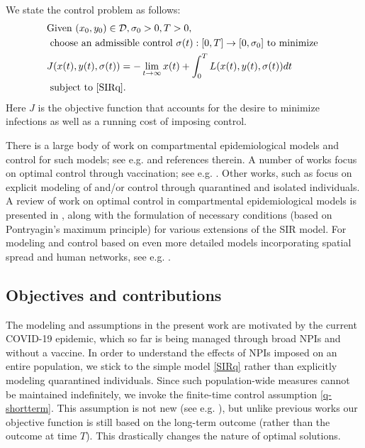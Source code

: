 \documentclass[english,12pt,letter]{article}
\newcommand{\Rnot}{\sigma_0}
\newcommand{\dom}{{\mathcal D}}
\begin{document}
We state the control problem as follows:
\begin{align} \label{eq:inf-time-problem}
\begin{aligned}
& \text{Given } (x_0, y_0)\in\dom, \sigma_0>0, T>0,  \\
& \text{ choose an admissible control } \sigma(t): [0,T] \to [0,\Rnot] \text{ to minimize }  \\
&     J(x(t),y(t),\sigma(t)) = -\lim_{t\to\infty} x(t) + \int_0^T L(x(t),y(t),\sigma(t)) dt \\
& \text{ subject to } \eqref{SIRq}.
\end{aligned}
\end{align}
Here $J$ is the objective function that accounts for the desire to
minimize infections as well as a running cost of imposing control.


There is a large body of work on compartmental epidemiological models
and control for such models; see e.g. \cite{hethcote2000mathematics,lenhart2007optimal}
and references therein.  A number of works focus on optimal control
through vaccination; see e.g. \cite{kar2011stability}.
Other works, such as \cite{yan2008optimal,safi2013dynamics,agusto2013optimal}
focus on explicit modeling of and/or control through quarantined and isolated individuals.
A review of work on optimal control in compartmental epidemiological models is
presented in \cite{sharomi2017optimal},
along with the formulation of necessary conditions (based on
Pontryagin's maximum principle) for various extensions of the SIR model.
For modeling and control based on even more detailed models incorporating
spatial spread and human networks, see e.g. \cite{ferguson2005strategies}.

\subsection{Objectives and contributions}

The modeling and assumptions in the present work are motivated by the
current COVID-19 epidemic, which so far is being managed through broad
NPIs and without a vaccine.  In order to understand the effects of NPIs
imposed on an entire population, we stick to the simple model \eqref{SIRq}
rather than explicitly modeling quarantined individuals.
Since such population-wide measures cannot be maintained indefinitely, we
invoke the finite-time control assumption \eqref{q-shortterm}.
This assumption is not new (see e.g. \cite{greenhalgh1988some}),
but unlike previous works our objective function is still based on the
long-term outcome (rather than the outcome at time $T$).
This drastically changes the nature of optimal solutions.
\end{document}
